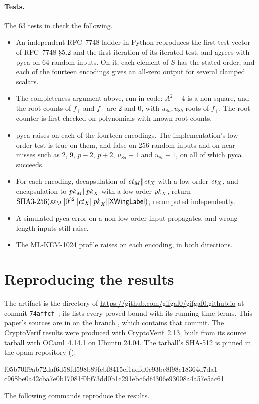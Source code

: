 \paragraph{Tests.} The 63 tests in 
check the following.
\begin{itemize}[itemsep=1pt,topsep=3pt]
  \item An independent RFC~7748 ladder in Python reproduces the first test
  vector of RFC~7748 \S5.2 and the first iteration of its iterated test, and agrees with
  pyca on 64 random inputs. On it, each element of $S$ has the stated order,
  and each of the fourteen encodings gives an all-zero output for several
  clamped scalars.
  \item The completeness argument above, run in code: $A^2-4$ is a
  non-square, and the root counts of $f_{+}$ and $f_{-}$ are 2 and 0, with
  $u_{8a}, u_{8b}$ roots of $f_{+}$. The root counter is first checked on
  polynomials with known root counts.
  \item pyca raises on each of the fourteen encodings. The implementation's
  low-order test is true on them, and false on 256 random inputs and on near
  misses such as $2$, $9$, $p-2$, $p+2$, $u_{8a}+1$ and $u_{8b}-1$, on all of
  which pyca succeeds.
  \item For each encoding, decapsulation of $\mathit{ct}_M \| \mathit{ct}_X$ with a low-order
  $\mathit{ct}_X$, and encapsulation to $\mathit{pk}_M \| \mathit{pk}_X$ with a low-order $\mathit{pk}_X$,
  return $\text{SHA3-256}(\mathit{ss}_M \| 0^{32} \| \mathit{ct}_X \| \mathit{pk}_X \| \mathsf{XWingLabel})$,
  recomputed independently.
  \item A simulated pyca error on a non-low-order input propagates, and
  wrong-length inputs still raise.
  \item The ML-KEM-1024 profile raises on each encoding, in both
  directions.
\end{itemize}

\section{Reproducing the results}\label{app:repro}

The artifact is the  directory of
\url{https://github.com/gifgaf0/gifgaf0.github.io} at commit
\texttt{74affcf}~\cite{Artifact}; its  lists every proved
bound with its running-time terms. This paper's sources are in
 on the branch , which
contains that commit. The CryptoVerif results were produced with
CryptoVerif~2.13, built from its source tarball with OCaml~4.14.1 on Ubuntu
24.04. The tarball's SHA-512 is pinned in the opam repository
():
\par\smallskip
{\centering\footnotesize\ttfamily
f05b70ff9ab72daf6d58fd598b89fcbf8415cf1adfd0c93be8f98c18364d7da1\\
c968be0a42cba7e0b17081f0bf73dd0b1c291ebc6df4306e93008a4a57e5ac61\par}
\noindent The following commands reproduce the results.


